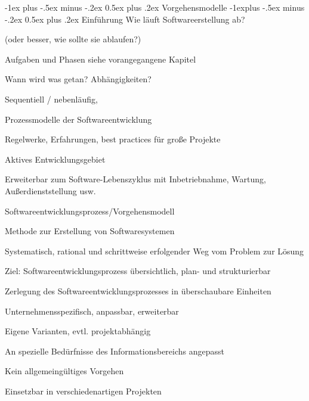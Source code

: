 \documentclass[a4paper]{article}
\makeatletter
\renewcommand{\section}{\@startsection{section}{1}{0mm}%
                                {-1ex plus -.5ex minus -.2ex}%
                                {0.5ex plus .2ex}%
                                {\normalfont\large\bfseries}}
\renewcommand{\subsection}{\@startsection{subsection}{2}{0mm}%
                                {-1explus -.5ex minus -.2ex}%
                                {0.5ex plus .2ex}%
                                {\normalfont\normalsize\bfseries}}
\makeatother
\begin{document}
\begin{multicols}{3}
  \newpage
  \section{Vorgehensmodelle}
  \subsection{Einführung}
  Wie läuft Softwareerstellung ab?
  \begin{itemize*}
    \item (oder besser, wie sollte sie ablaufen?)
    \item Aufgaben und Phasen siehe vorangegangene Kapitel
    \item Wann wird was getan? Abhängigkeiten?
    \begin{itemize*}
      \item Sequentiell / nebenläufig,
    \end{itemize*}
    \item Prozessmodelle der Softwareentwicklung
    \begin{itemize*}
      \item Regelwerke, Erfahrungen, best practices für große Projekte
      \item Aktives Entwicklungsgebiet
    \end{itemize*}
    \item Erweiterbar zum Software-Lebenszyklus mit Inbetriebnahme, Wartung, Außerdienststellung usw.
  \end{itemize*}

  Softwareentwicklungsprozess/Vorgehensmodell
  \begin{itemize*}
    \item Methode zur Erstellung von Softwaresystemen
    \item Systematisch, rational und schrittweise erfolgender Weg vom Problem zur Lösung
    \item Ziel: Softwareentwicklungsprozess übersichtlich, plan- und strukturierbar
    \item Zerlegung des Softwareentwicklungsprozesses in überschaubare Einheiten
    \item Unternehmensspezifisch, anpassbar, erweiterbar
    \begin{itemize*}
      \item Eigene Varianten, evtl. projektabhängig
      \item An spezielle Bedürfnisse des Informationsbereichs angepasst
      \item Kein allgemeingültiges Vorgehen
      \item Einsetzbar in verschiedenartigen Projekten
    \end{itemize*}
  \end{itemize*}


\end{multicols}
\end{document}
